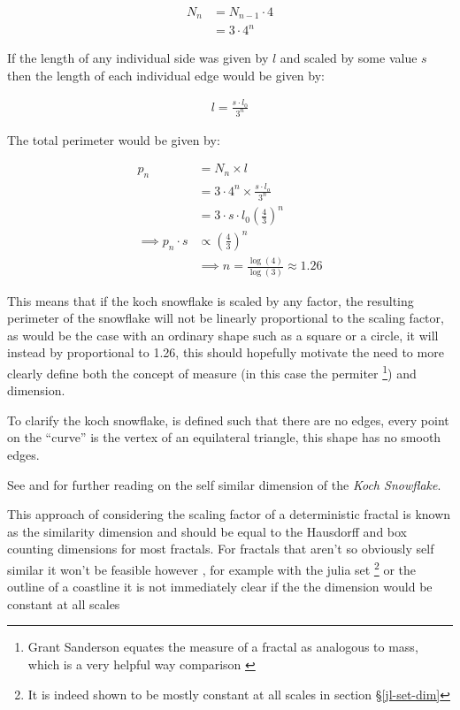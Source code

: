 \documentclass[a4paper,11pt,twoside]{article}
\begin{document}
\begin{align}
N_{n} &= N_{n-1} \cdot 4 \\
&= 3 \cdot 4^{n}
\end{align}

If the length of any individual side was given by \(l\) and scaled by some value \(s\) then the length of each individual edge would be given by:

\begin{align}
l = \frac{s \cdot l_{0}}{3^{n}}
\end{align}

The total perimeter would be given by:

\begin{align}
p_{n} &= N_{n} \times l \\
&= 3\cdot 4^{n} \times \frac{s \cdot l_{o}}{3^{n}} \\
&= 3 \cdot s \cdot  l_{0} \left( \frac{4}{3} \right)^{n}\\
 \implies p_{n} \cdot s & \propto \left(\frac{4}{3}\right)^{n}\\
& \implies  n = \frac{\log\left( 4 \right)}{\log\left( 3 \right)} \approx 1.26 \label{eq:koch-dim}
\end{align}

This means that if the koch snowflake is scaled by any factor, the resulting perimeter of the snowflake will not be linearly proportional to the scaling factor, as would be the case with an ordinary shape such as a square or a circle, it will instead by proportional to 1.26, this should hopefully motivate the need to more clearly define both the concept of measure (in this case the permiter \footnote{Grant Sanderson equates the measure of a fractal as analogous to mass, which is a very helpful way comparison \cite{sandersonFractalsAreTypically2017}}) and dimension.

To clarify the koch snowflake, is defined such that there are no edges, every point on the ``curve'' is the vertex of an equilateral triangle, this shape has no smooth edges.

See \cite[p. 414]{strogatzNonlinearDynamicsChaos2015} and \cite[\S 5.4]{baderSpacefillingCurvesIntroduction2013} for further reading on the self similar dimension of the \emph{Koch Snowflake}.

This approach of considering the scaling factor of a deterministic fractal is
known as the similarity dimension \cite[p.
413]{strogatzNonlinearDynamicsChaos2015} and should be equal to the Hausdorff and box counting dimensions for most
fractals. For fractals that aren't so obviously self similar it won't be
feasible however \cite[p. 393]{liIntegrationFuzzyLogic2006}, for example with
the julia set \footnote{It is indeed shown to be
mostly constant at all scales in section \S \ref{jl-set-dim}} or the outline of a coastline it is not immediately clear if the
the dimension would be constant at all scales
\end{document}
